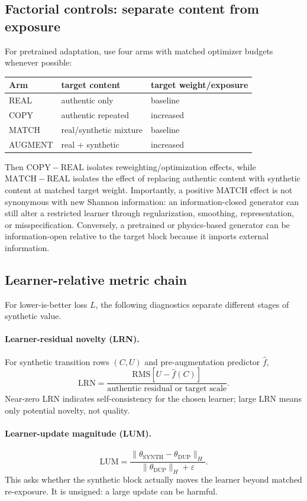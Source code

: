 \subsection{Factorial controls: separate content from exposure}
For pretrained adaptation, use four arms with matched optimizer budgets whenever possible:
\begin{center}
\begin{tabular}{lll}
\toprule
Arm & target content & target weight/exposure\\
\midrule
REAL & authentic only & baseline\\
COPY & authentic repeated & increased\\
MATCH & real/synthetic mixture & baseline\\
AUGMENT & real + synthetic & increased\\
\bottomrule
\end{tabular}
\end{center}
Then $\mathrm{COPY}-\mathrm{REAL}$ isolates reweighting/optimization effects, while $\mathrm{MATCH}-\mathrm{REAL}$ isolates the effect of replacing authentic content with synthetic content at matched target weight. Importantly, a positive MATCH effect is not synonymous with new Shannon information: an information-closed generator can still alter a restricted learner through regularization, smoothing, representation, or misspecification. Conversely, a pretrained or physics-based generator can be information-open relative to the target block because it imports external information.

\subsection{Learner-relative metric chain}
For lower-is-better loss $L$, the following diagnostics separate different stages of synthetic value.

\paragraph{Learner-residual novelty (LRN).}
For synthetic transition rows $(C,U)$ and pre-augmentation predictor $\widehat f$,
\[
\mathrm{LRN}=\frac{\mathrm{RMS}[U-\widehat f(C)]}{\text{authentic residual or target scale}}.
\]
Near-zero LRN indicates self-consistency for the chosen learner; large LRN means only potential novelty, not quality.

\paragraph{Learner-update magnitude (LUM).}
\[
\mathrm{LUM}=\frac{\|\theta_{\mathrm{SYNTH}}-\theta_{\mathrm{DUP}}\|_H}
{\|\theta_{\mathrm{DUP}}\|_H+\varepsilon}.
\]
This asks whether the synthetic block actually moves the learner beyond matched re-exposure. It is unsigned: a large update can be harmful.

